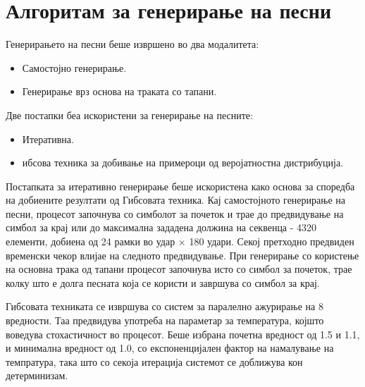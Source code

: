 \section{Алгоритам за генерирање на песни}

Генерирањето на песни беше извршено во два модалитета: 
\begin{itemize}
    \item Самостојно генерирање.
    \item Генерирање врз основа на траката со тапани.
\end{itemize}

Две постапки беа искористени за генерирање на песните: 
\begin{itemize}
    \item Итеративна.
    \item ибсова техника за добивање на примероци од веројатностна дистрибуција.
\end{itemize}

Постапката за итеративно генерирање беше искористена како основа за споредба на добиените резултати од Гибсовата техника. Кај самостојното генерирање на песни, процесот започнува со симболот за почеток и трае до предвидување на симбол за крај или до максимална зададена должина на секвенца - 4320 елементи, добиена од 24 рамки во удар × 180 удари. Секој претходно предвиден временски чекор влијае на следното предвидување. При генерирање со користење на основна трака од тапани процесот започнува исто со симбол за почеток, трае колку што е долга песната која се користи и завршува со симбол за крај.

Гибсовата техниката се извршува со систем за паралелно ажурирање на 8 вредности. Таа предвидува употреба на параметар за температура, којшто воведува стохастичност во процесот. Беше избрана почетна вредност од 1.5 и 1.1, и минимална вредност од 1.0, со експоненцијален фактор на намалување на темпратура, така што со секоја итерација системот се доближува кон детерминизам.

